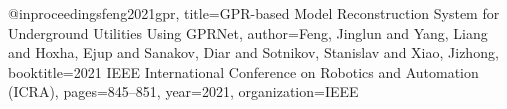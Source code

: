 @inproceedings{feng2021gpr,
	title={GPR-based Model Reconstruction System for Underground Utilities Using GPRNet},
	author={Feng, Jinglun and Yang, Liang and Hoxha, Ejup and Sanakov, Diar and Sotnikov, Stanislav and Xiao, Jizhong},
	booktitle={2021 IEEE International Conference on Robotics and Automation (ICRA)},
	pages={845--851},
	year={2021},
	organization={IEEE}
}